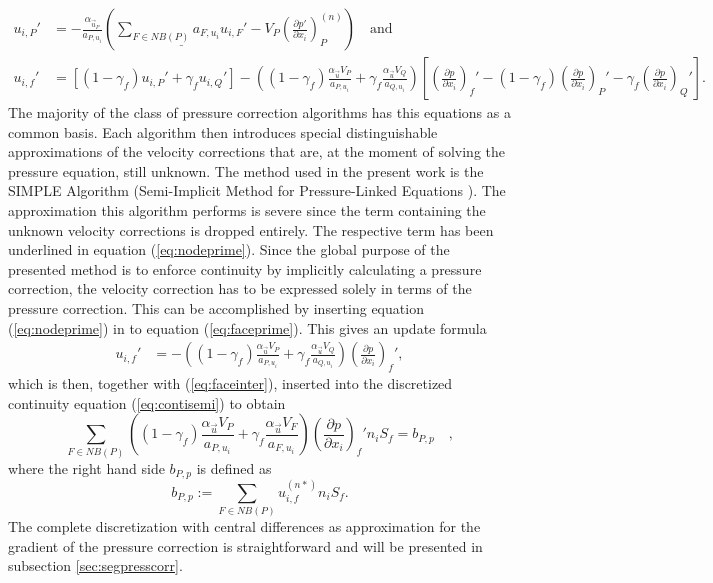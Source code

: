   \begin{align}
    \label{eq:nodeprime}
    u_{i,P}' 
    &=  
    - \frac{\alpha_{\vec{u}_P}}{a_{P,u_i}} \left(\underline{\sum_{F \in NB(P)} a_{F,u_i} u_{i,F}'}
    - V_P\left(\frac{\partial p'}{\partial x_i}\right)_P^{(n)} \right) \quad \text{and}\\[1em]
    \label{eq:faceprime}
    u_{i,f}' 
    &= 
    \left[\left(1 - \gamma_f\right) u_{i,P}' + \gamma_f u_{i,Q}' \right] 
    - 
    \left(\left(1 - \gamma_f\right) \frac{\alpha_\vec{u} V_P}{a_{P,u_i}} + \gamma_f \frac{\alpha_\vec{u} V_Q}{a_{Q,u_i}}\right)
    \left[ 
    \left(\frac{\partial p}{\partial x_i}\right)_f' 
    - \left( 1 - \gamma_f \right) \left( \frac{\partial p}{\partial x_i} \right)_P' 
    - \gamma_f \left(\frac{\partial p}{\partial x_i}\right)_Q' 
    \right].
  \end{align}
  The majority of the class of pressure correction algorithms has this equations as a common basis. Each algorithm then introduces special distinguishable approximations of the velocity corrections that are, at the moment of solving the pressure equation, still unknown. The method used in the present work is the SIMPLE Algorithm (Semi-Implicit Method for Pressure-Linked Equations \cite{patankar72}). The approximation this algorithm performs is severe since the term containing the unknown velocity corrections is dropped entirely. The respective term has been underlined in equation (\ref{eq:nodeprime}). Since the global purpose of the presented method is to enforce continuity by implicitly calculating a pressure correction, the velocity correction has to be expressed solely in terms of the pressure correction. This can be accomplished by inserting equation (\ref{eq:nodeprime}) in to equation (\ref{eq:faceprime}). This gives an update formula
  \begin{align}
    u_{i,f}' 
    &= 
    - \left(\left(1 - \gamma_f\right) \frac{\alpha_\vec{u} V_P}{a_{P,u_i}} + \gamma_f \frac{\alpha_\vec{u} V_Q}{a_{Q,u_i}}\right)
    \left(\frac{\partial p}{\partial x_i}\right)_f',
  \end{align}
  which is then, together with (\ref{eq:faceinter}), inserted into the discretized continuity equation (\ref{eq:contisemi}) to obtain
  \begin{equation}
    \label{eq:presscorr}
    \sum_{F \in NB(P)} \left(\left(1 - \gamma_f\right) \frac{\alpha_\vec{u} V_P}{a_{P,u_i}} + \gamma_f \frac{\alpha_\vec{u} V_F}{a_{F,u_i}}\right)
    \left(\frac{\partial p}{\partial x_i}\right)_f' n_i S_f
    = b_{P,p}
    \quad,
  \end{equation}
  where the right hand side \(b_{P,p}\) is defined as
  \begin{equation}
    \label{eq:presscorrb}
    b_{P,p} := \sum_{F \in NB(P)} u_{i,f}^{(n*)} n_i S_f.
  \end{equation}
  The complete discretization with central differences as approximation for the gradient of the pressure correction is straightforward and will be presented in subsection \ref{sec:segpresscorr}.
  
